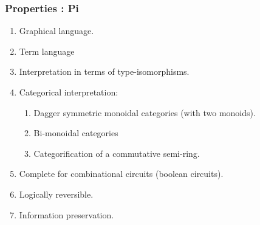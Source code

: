 \documentclass[svgnames,11pt]{beamer}
\begin{document}
\begin{frame}
\frametitle{Properties : {{Pi}} }


\begin{enumerate}

\vfill
\item Graphical language. 

\vfill
\item Term language

\vfill
\item Interpretation in terms of type-isomorphisms. 

\vfill
\item Categorical interpretation: 

  \begin{enumerate}
  \item Dagger symmetric monoidal categories (with two monoids). 
  \item Bi-monoidal categories
  \item Categorification of a commutative semi-ring. 
  \end{enumerate}

\vfill
\item Complete for combinational circuits (boolean circuits).

\vfill
\item Logically reversible.

\pause
\vfill
\item Information preservation. 

\end{enumerate}


\end{frame}
\end{document}
